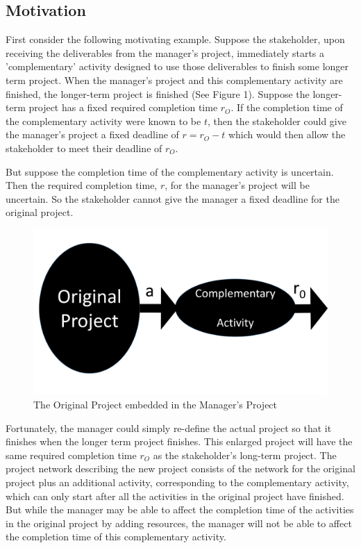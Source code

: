 \documentclass[11pt]{article}
\begin{document}
\subsection{Motivation}
First consider the following motivating example. Suppose the stakeholder, upon receiving the deliverables from the manager's project, immediately starts a 'complementary' activity designed to use those deliverables to finish some longer term project.  When the manager's project and this complementary activity are finished, the longer-term project is finished (See Figure 1).   Suppose the longer-term project has a fixed required completion time $r_O$.   If the completion time of the complementary activity were known to be $t$, then the stakeholder could give the manager's project a fixed deadline of $r=r_O-t$ which would then allow the stakeholder to meet their deadline of $r_O$. \par
But suppose the completion time of the complementary activity is uncertain. Then the required completion time, $r$, for the manager’s project will be uncertain.   So the stakeholder cannot give the manager a fixed deadline for the original project.\par
\begin{figure}[ht]
\begin{center}
\includegraphics[scale=0.30]{uncertaindeadlines.pdf}
\caption{The Original Project embedded in the Manager's Project}
\label{fig:orginalproject}
\end{center}
\end{figure}
          Fortunately, the manager could simply re-define the actual project so that it finishes when the longer term project finishes.    This enlarged project will have the same required completion time $r_O$ as the stakeholder's long-term project.   The project network describing the new project consists of the network for the original project plus an additional activity, corresponding to the complementary activity, which can only start after all the activities in the original project have finished.  But while the manager may be able to affect the completion time of the activities in the original project by adding resources, the manager will not be able to affect the completion time of this complementary activity. \par
\end{document}
